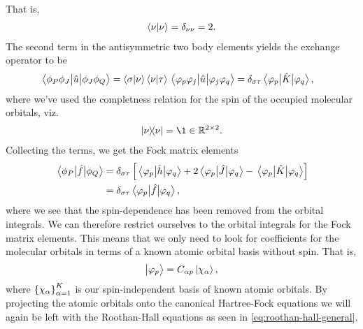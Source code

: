             That is,
            \begin{align}
                \braket{\nu}{\nu} = \delta_{\nu\nu} = 2.
            \end{align}
            The second term in the antisymmetric two body elements yields the
            exchange operator to be
            \begin{align}
                \mel{\phi_P\phi_J}{\hat{u}}{\phi_J\phi_Q}
                &= \braket{\sigma}{\nu}\braket{\nu}{\tau}
                \mel{\varphi_p\varphi_j}{\hat{u}}{\varphi_j\varphi_q}
                = \delta_{\sigma\tau}
                \mel{\varphi_p}{\hat{K}}{\varphi_q},
            \end{align}
            where we've used the completness relation for the spin of the
            occupied molecular orbitals, viz.
            \begin{align}
                \dyad{\nu}
                = \1 \in \mathbb{R}^{2 \times 2}.
            \end{align}
            Collecting the terms, we get the Fock matrix elements
            \begin{align}
                \mel{\phi_P}{\hat{f}}{\phi_Q}
                &=
                \delta_{\sigma\tau}
                \left[ 
                    \mel{\varphi_p}{\hat{h}}{\varphi_q}
                    +
                    2
                    \mel{\varphi_p}{\hat{J}}{\varphi_q}
                    -
                    \mel{\varphi_p}{\hat{K}}{\varphi_q}
                 \right]
                \\
                &= \delta_{\sigma\tau}
                \mel{\varphi_p}{\hat{f}}{\varphi_q},
            \end{align}
            where we see that the spin-dependence has been removed from the
            orbital integrals.
            We can therefore restrict ourselves to the orbital integrals for the
            Fock matrix elements.
            This means that we only need to look for coefficients for the
            molecular orbitals in terms of a known atomic orbital basis without
            spin.
            That is,
            \begin{align}
                \ket{\varphi_p} = C_{\alpha p} \ket{\chi_{\alpha}},
            \end{align}
            where $\left\{ \chi_{\alpha} \right\}_{\alpha = 1}^{K}$ is our
            spin-independent basis of known atomic orbitals.
            By projecting the atomic orbitals onto the canonical Hartree-Fock
            equations we will again be left with the Roothan-Hall equations as
            seen in \autoref{eq:roothan-hall-general}.

